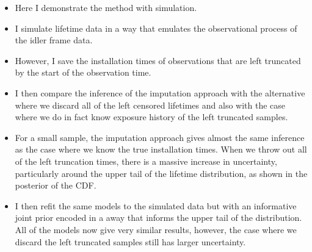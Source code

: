 \begin{itemize}
    \item Here I demonstrate the method with simulation.
    \item I simulate lifetime data in a way that emulates the observational process of the idler frame data.
    \item However, I save the installation times of observations that are left truncated by the start of the observation time.
    \item I then compare the inference of the imputation approach with the alternative where we discard all of the left censored lifetimes and also with the case where we do in fact know exposure history of the left truncated samples.
    \item For a small sample, the imputation approach gives almost the same inference as the case where we know the true installation times. When we throw out all of the left truncation times, there is a massive increase in uncertainty, particularly around the upper tail of the lifetime distribution, as shown in the posterior of the CDF.
    \item I then refit the same models to the simulated data but with an informative joint prior encoded in a away that informs the upper tail of the distribution. All of the models now give very similar results, however, the case where we discard the left truncated samples still has larger uncertainty.
\end{itemize}


